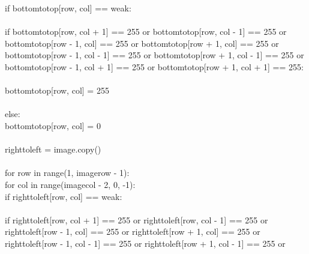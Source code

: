 \documentclass{article}
\begin{document}
	\indent \indent \indent if bottom\textunderscore to\textunderscore top[row, col] == weak:\\
	\\
	\indent \indent \indent \indent if bottom\textunderscore to\textunderscore top[row, col + 1] == 255 or bottom\textunderscore to\textunderscore top[row, col - 1] == 255 or \\
	\indent \indent \indent \indent   bottom\textunderscore to\textunderscore top[row - 1, col] == 255 or bottom\textunderscore to\textunderscore top[row + 1, col] == 255 or\\
	\indent \indent \indent \indent   bottom\textunderscore to\textunderscore top[row - 1, col - 1] == 255 or bottom\textunderscore to\textunderscore top[row + 1, col - 1] == 255 or\\
	\indent \indent \indent \indent   bottom\textunderscore to\textunderscore top[row - 1, col + 1] == 255 or bottom\textunderscore to\textunderscore top[row + 1, col + 1] == 255:\\
	\\
	\indent \indent \indent \indent \indent bottom\textunderscore to\textunderscore top[row, col] = 255\\
	\\
	\indent \indent \indent \indent else:\\
	\indent \indent \indent \indent \indent bottom\textunderscore to\textunderscore top[row, col] = 0\\
	\\
	\indent right\textunderscore to\textunderscore left = image.copy()\\
	\\
	\indent for row in range(1, image\textunderscore row - 1):\\
	\indent \indent for col in range(image\textunderscore col - 2, 0, -1):\\
	\indent \indent \indent if right\textunderscore to\textunderscore left[row, col] == weak:\\
	\\
	\indent \indent \indent \indent if right\textunderscore to\textunderscore left[row, col + 1] == 255 or right\textunderscore to\textunderscore left[row, col - 1] == 255 or \\
	\indent \indent \indent \indent   right\textunderscore to\textunderscore left[row - 1, col] == 255 or right\textunderscore to\textunderscore left[row + 1, col] == 255 or \\
	\indent \indent \indent \indent   right\textunderscore to\textunderscore left[row - 1, col - 1] == 255 or right\textunderscore to\textunderscore left[row + 1, col - 1] == 255 or \\
\end{document}
